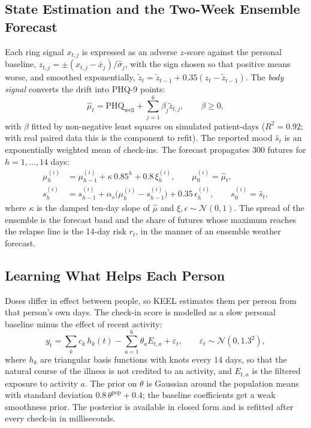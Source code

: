 \documentclass[11pt,a4paper]{article}
\begin{document}
\subsection{State Estimation and the Two-Week Ensemble Forecast}

Each ring signal $x_{t,j}$ is expressed as an adverse $z$-score against the personal baseline, $z_{t,j} = \pm (x_{t,j} - \bar x_j)/\hat\sigma_j$, with the sign chosen so that positive means worse, and smoothed exponentially, $\tilde z_t = \tilde z_{t-1} + 0.35(z_t - \tilde z_{t-1})$. The \emph{body signal} converts the drift into PHQ-9 points:
\begin{equation}
\hat\mu_t = \mathrm{PHQ}_{\text{well}} + \sum_{j=1}^{6} \beta_j \tilde z_{t,j}, \qquad \beta \geq 0,
\label{eq:body}
\end{equation}
with $\beta$ fitted by non-negative least squares on simulated patient-days ($R^2 = 0.92$; with real paired data this is the component to refit). The reported mood $\hat s_t$ is an exponentially weighted mean of check-ins. The forecast propagates 300 futures for $h = 1,\dots,14$ days:
\begin{align}
\mu^{(i)}_h &= \mu^{(i)}_{h-1} + \kappa\, 0.85^{h} + 0.8\,\xi^{(i)}_h, \qquad \mu^{(i)}_0 = \hat\mu_t,\\
s^{(i)}_h &= s^{(i)}_{h-1} + \alpha_s\big(\mu^{(i)}_h - s^{(i)}_{h-1}\big) + 0.35\,\epsilon^{(i)}_h, \qquad s^{(i)}_0 = \hat s_t,
\end{align}
where $\kappa$ is the damped ten-day slope of $\hat\mu$ and $\xi,\epsilon \sim \mathcal{N}(0,1)$. The spread of the ensemble is the forecast band and the share of futures whose maximum reaches the relapse line is the 14-day risk $r_t$, in the manner of an ensemble weather forecast.

\subsection{Learning What Helps Each Person}

Doses differ in effect between people, so KEEL estimates them per person from that person's own days. The check-in score is modelled as a slow personal baseline minus the effect of recent activity:
\begin{equation}
y_t = \sum_{k} c_k\, h_k(t) - \sum_{a=1}^{6} \theta_a E_{t,a} + \varepsilon_t, \qquad \varepsilon_t \sim \mathcal{N}(0, 1.3^2),
\label{eq:learner}
\end{equation}
where $h_k$ are triangular basis functions with knots every 14 days, so that the natural course of the illness is not credited to an activity, and $E_{t,a}$ is the filtered exposure to activity $a$. The prior on $\theta$ is Gaussian around the population means with standard deviation $0.8\,\theta^{\text{pop}} + 0.4$; the baseline coefficients get a weak smoothness prior. The posterior is available in closed form and is refitted after every check-in in milliseconds.
\end{document}
